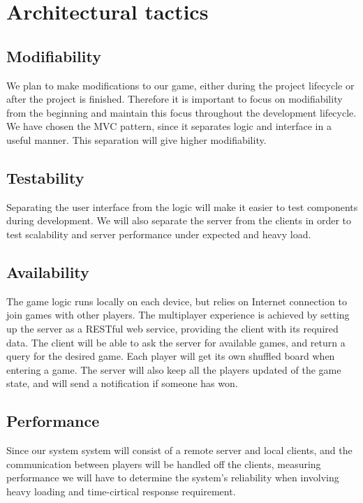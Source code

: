 \section{Architectural tactics}
\label{sec:architecturaltactics}

\subsection{Modifiability} 
We plan to make modifications to our game, either during the project lifecycle
or after the project is finished. Therefore it is important to focus on
modifiability from the beginning and maintain this focus throughout the
development lifecycle. We have chosen the MVC pattern, since it separates logic
and interface in a useful manner. This separation will give higher
modifiability.

\subsection{Testability}
Separating the user interface from the logic will make it easier to test
components during development. We will also separate the server from the
clients in order to test scalability and server performance under expected and
heavy load.

\subsection{Availability} 
The game logic runs locally on each device, but relies on Internet connection
to join games with other players. The multiplayer experience is achieved by
setting up the server as a RESTful web service, providing the client with its
required data. The client will be able to ask the server for available games,
and return a query for the desired game. Each player will get its own shuffled
board when entering a game. The server will also keep all the players updated
of the game state, and will send a notification if someone has won.

\subsection{Performance}
Since our system system will consist of a remote server and local clients, and
the communication between players will be handled off the clients, measuring
performance we will have to determine the system's reliability when involving
heavy loading and time-cirtical response requirement.

